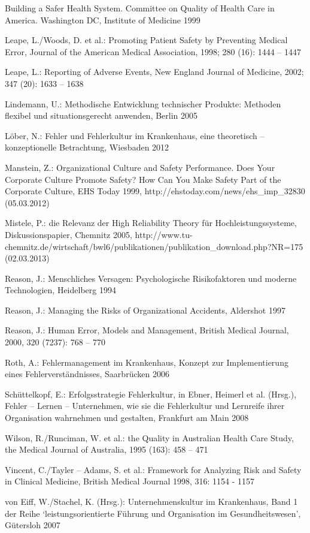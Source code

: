 \begin{description}
Building a Safer Health System. Committee on Quality of
Health Care in America. Washington DC, Institute of
Medicine 1999
\item[] Leape, L./Woods, D. et al.: Promoting Patient Safety
by Preventing Medical Error, Journal of the American
Medical Association, 1998; 280 (16): 1444 – 1447
\item[] Leape, L.: Reporting of Adverse Events, New England
Journal of Medicine, 2002; 347 (20): 1633 – 1638
\item[] Lindemann, U.: Methodische Entwicklung technischer
Produkte: Methoden flexibel und situationsgerecht anwenden,
Berlin 2005
\item[] Löber, N.: Fehler und Fehlerkultur im Krankenhaus,
eine theoretisch – konzeptionelle Betrachtung, Wiesbaden
2012
\item[] Manstein, Z.: Organizational Culture and Safety
Performance. Does Your Corporate Culture Promote Safety?
How Can You Make Safety Part of the Corporate Culture, EHS
Today 1999, http://ehstoday.com/news/ehs\_imp\_32830
(05.03.2012)
\item[] Mistele, P.: die Relevanz der High Reliability Theory
für Hochleistungssysteme, Diskussionspapier, Chemnitz 2005,
http://www.tu-chemnitz.de/wirtschaft/bwl6/publikationen/publikation\_download.php?NR=175
(02.03.2013)
\item[] Reason, J.: Menschliches Versagen: Psychologische
Risikofaktoren und moderne Technologien, Heidelberg 1994
\item[] Reason, J.: Managing the Risks of Organizational
Accidents, Aldershot 1997
\item[] Reason, J.: Human Error, Models and Management,
British Medical Journal, 2000, 320 (7237): 768 – 770
\item[] Roth, A.: Fehlermanagement im Krankenhaus, Konzept zur
Implementierung eines Fehlerverständnisses, Saarbrücken
2006
\item[] Schüttelkopf, E.: Erfolgsstrategie Fehlerkultur, in
Ebner, Heimerl et al. (Hrsg.), Fehler – Lernen –
Unternehmen, wie sie die Fehlerkultur und Lernreife ihrer
Organisation wahrnehmen und gestalten, Frankfurt am Main
2008
\item[] Wilson, R./Runciman, W. et al.: the Quality in
Australian Health Care Study, the Medical Journal of
Australia, 1995 (163): 458 – 471
\item[] Vincent, C./Tayler – Adams, S. et al.: Framework for
Analyzing Risk and Safety in Clinical Medicine, British
Medical Journal 1998, 316: 1154 - 1157
\item[] von Eiff, W./Stachel, K. (Hrsg.): Unternehmenskultur
im Krankenhaus, Band 1 der Reihe \enquote*{leistungsorientierte
Führung und Organisation im Gesundheitswesen}, Gütersloh
2007
\end{description}


\ChapterEnd
